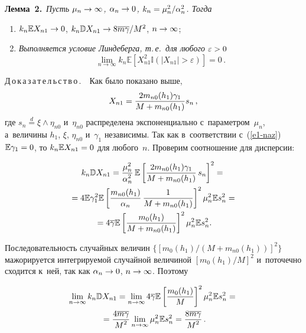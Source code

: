 \begin{multicols}{2}
\smallskip

\noindent
\textbf{Лемма~2.}\  \textit{Пусть $\mu_n\hm \rightarrow \infty$, 
$\alpha_n \hm\rightarrow 0$, $k_n \hm= {\mu_n^2}/{\alpha_n^2}$.  Тогда}
\begin{enumerate}[(1)]
\item $k_n\mathbb{E}X_{n1}\hm\rightarrow 0$, 
$k_n\mathbb{D}X_{n1}\hm\rightarrow {8\overline{m}\overline{\gamma}}/{M^2}$,
$n\hm\rightarrow\infty$;
\item \textit{Выполняется условие Линдеберга, т.\,е.\ для любого} $\varepsilon \hm>0$
\begin{equation*}
\lim\limits_{n\rightarrow\infty}k_n
\mathbb{E}\left[X_{n1}^2\mathbb{I}(|X_{n1}|>\varepsilon)\right]=0\,.
\end{equation*}
\end{enumerate}

\noindent
Д\,о\,к\,а\,з\,а\,т\,е\,л\,ь\,с\,т\,в\,о\,.\ \
Как было показано выше, 
$$
X_{n1} = \displaystyle\frac{\displaystyle 2 m_{n0}(h_1)\gamma_{1}\mathstrut}{\displaystyle M+ m_{n0}(h_1)\mathstrut}s_n\,,
$$
 где $s_n\stackrel{d} =\xi\wedge\eta_{n0}$ и~$\eta_{n0}$ распределена 
 экспоненциально с~параметром~$\mu_n$, а~величины $h_1$, $\xi$, $\eta_{n0}$
и~$\gamma_{1}$ независимы. Так как в~соответствии с~(\ref{e1-naz}) 
 $\mathbb{E}\gamma_1 \hm= 0$, то $k_n\mathbb{E}X_{n1}\hm=0$ для любого~$n$. 
 Проверим соотношение для дисперсии:
 
 \noindent
\begin{multline*}
k_n\mathbb{D}X_{n1} = \displaystyle\frac{\displaystyle \mu_n^2\mathstrut}{\displaystyle \alpha_n^2\mathstrut}\, \mathbb{E} 
\left[\displaystyle\frac{\displaystyle 2 m_{n0}(h_1)\gamma_{1}\mathstrut}{\displaystyle M+ m_{n0}(h_1)\mathstrut}\,s_n\right]^2={}\\
{}=4\mathbb{E}\gamma_{1}^2\mathbb{E}\left[
\displaystyle\frac{\displaystyle m_{n0}(h_1)\mathstrut}{\displaystyle \alpha_n\mathstrut}\,\displaystyle\frac{\displaystyle 1\mathstrut}{\displaystyle M+m_{n0}(h_1)\mathstrut}\right]^2\mu_n^2\mathbb{E}s_n^2 = {}\\
{}=
4\overline{\gamma}\mathbb{E}\left[\displaystyle\frac{\displaystyle m_0(h_1)\mathstrut}{\displaystyle M+m_{n0}(h_1)\mathstrut}\right]^2\mu_n^2
\mathbb{E}s_n^2.
\end{multline*}

Последовательность случайных величин 
$\{[{m_0(h_1)}/({M+m_{n0}(h_1)})]^2\}$ мажорируется интегрируемой случайной 
величиной $[{m_0(h_1)}/{M}]^2$ и~поточечно сходится к~ней, так как $\alpha_n 
\hm\rightarrow 0$, $n\hm\rightarrow\infty$. Поэтому

\vspace*{-6pt}

\noindent
\begin{multline*}
\lim\limits_{n\rightarrow\infty}k_n\mathbb{D}X_{n1} =  
\lim\limits_{n\rightarrow\infty}4\overline{\gamma}\mathbb{E}
\left[\displaystyle\frac{\displaystyle m_0(h_1)\mathstrut}{\displaystyle M\mathstrut}\right]^2\mu_n^2\mathbb{E}s_n^2 ={}\\
{}=
\displaystyle\frac{\displaystyle 4\overline{m}\overline{\gamma}\mathstrut}{\displaystyle M^2\mathstrut}
\lim\limits_{n\rightarrow\infty}\mu_n^2\mathbb{E}s_n^2 = 
\displaystyle\frac{\displaystyle 8\overline{m}\overline{\gamma}\mathstrut}{\displaystyle M^2\mathstrut}\,.
\end{multline*}


\end{multicols}
